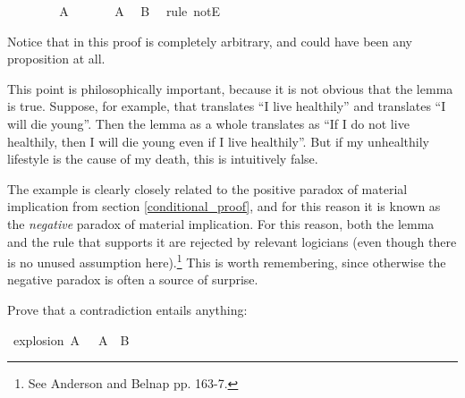 \begin{isabellebody}
\ \ \isamarkupfalse%
\isanewline
\ \ \ \ \isamarkupfalse%
\ {\isachardoublequoteopen}A{\isachardoublequoteclose}\isanewline
\ \ \ \ \isamarkupfalse%
\ {\isacharbackquoteopen}{\isasymnot}\ A{\isacharbackquoteclose}\ \isamarkupfalse%
\ B\ \isamarkupfalse%
\ {\isacharparenleft}rule\ notE{\isacharparenright}\isanewline
\ \ \isamarkupfalse%
\isanewline
{}\isamarkupfalse%
%
\endisatagproof
{\isafoldproof}%
%
\isadelimproof
%
\endisadelimproof
%
\begin{isamarkuptext}%
Notice that  in this proof is completely arbitrary, and could have been any
proposition at all.%
\end{isamarkuptext}\isamarkuptrue%
%
\begin{isamarkuptext}%
This point is philosophically important, because it is not obvious that the lemma is true.
Suppose, for example, that  translates ``I live healthily'' and  translates ``I
will die young''. Then the lemma as a whole translates as ``If I do not live healthily, then I will
die young even if I live healthily''. But if my unhealthily lifestyle is the cause of my death,
this is intuitively false.%
\end{isamarkuptext}\isamarkuptrue%
%
\begin{isamarkuptext}%
The example is clearly closely related to the positive paradox of material implication from
section \ref{conditional_proof}, and for this reason it is known as the \emph{negative} paradox of
material implication. For this reason, both the lemma and the rule that supports it are rejected by
relevant logicians (even though there is no unused assumption here).\footnote{See Anderson and Belnap
\cite{anderson_entailment_1976} pp. 163-7.}
This is worth remembering, since otherwise the negative paradox is often a source of surprise.%
\end{isamarkuptext}\isamarkuptrue%
%
\begin{isamarkuptext}%
\begin{Exercise}[label = explosion] Prove that a contradiction entails anything: \end{Exercise}%
\end{isamarkuptext}\isamarkuptrue%
\isamarkupfalse%
\ explosion{\isacharcolon}\ {\isachardoublequoteopen}A\ {\isasymand}\ {\isasymnot}\ A\ {\isasymlongrightarrow}\ B{\isachardoublequoteclose}%
\isadelimproof
\ %
\endisadelimproof
%
\isatagproof
{}\isamarkupfalse%

\end{isabellebody}
